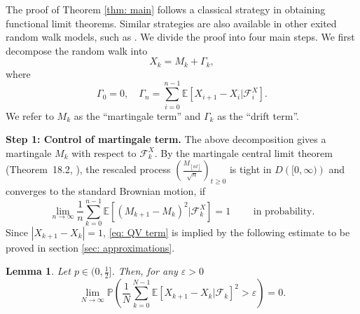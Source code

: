 \documentclass[twoside,12pt,a4paper]{article}
\newtheorem{lemma}{Lemma}[section]
\numberwithin{equation}{section}
\newcommand{\abs}[1]{\left\vert #1 \right\vert}
\begin{document}
	The proof of Theorem \ref{thm: main} follows a classical strategy in obtaining functional limit theorems. 
	Similar strategies are also available in other exited random walk models, such as \cite{KP16,KMP22}.
	We divide the proof into four main steps. We first decompose the random walk into
	\begin{equation}
		\label{eqn:decomposition}
		X_k = M_k+ \Gamma_k 
		,\end{equation} 
	where
	\[ 
	\Gamma_0 = 0, \quad \Gamma_n = \sum_{i=0}^{n-1} \mathbb{E}\left[ X_{i+1}-X_i | \mathcal{F}_i^X 
	\right].
	\] 
	We refer to $M_k$ as the ``martingale term'' and $\Gamma_k$ as the ``drift term''.
	
	\vspace{1em}
	
	\textbf{Step 1: Control of martingale term.}
	The above decomposition gives a martingale $M_k$ with respect to $\mathcal{F}_k^X.$ By the martingale central limit theorem (Theorem~18.2, \cite{B99}), the rescaled process $\left( \frac{M_{\left\lfloor n t \right\rfloor}}{\sqrt{n}} \right) _{t \ge 0}$ is tight in $D\left( [0,\infty ) \right) $ and converges to the standard Brownian motion, if
	\begin{equation}\label{eq: QV term}
		\lim_{n\to \infty}\frac{1}{n} \sum_{k=0}^{n-1}\mathbb{E}\left[ (M_{k+1}- M_{k})^2 |\mathcal{F}_k^X \right] =1 \qquad  \mbox{ in probability}.
	\end{equation}
	Since $\abs{X_{k+1}-X_k}=1$,  \eqref{eq: QV term} is implied by the following estimate to be proved in section \ref{sec: approximations}. 
	\begin{lemma} \label{lm: control of martingale} 
		Let $p\in (0,\frac{1}{2}]$. Then, for any $\varepsilon >0$
		\begin{equation}\label{eq:  term}
			\lim_{N \to \infty }\mathbb{P}\left(\frac{1}{N} \sum_{k = 0}^{N-1} \mathbb{E}\left[ X_{k+1} - X_k | \mathcal{F}_k \right]^2 > \varepsilon \right) =0. 
		\end{equation}
	\end{lemma}
	\vspace{1em}
	
\end{document}
